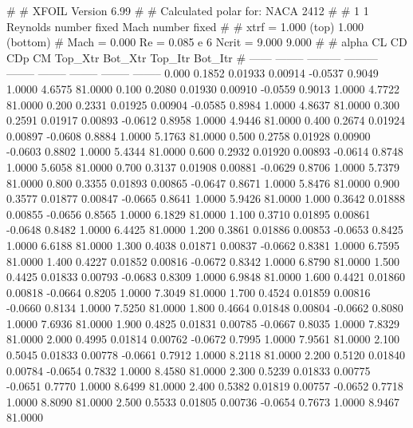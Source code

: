 #  
#       XFOIL         Version 6.99
#  
# Calculated polar for: NACA 2412                                       
#  
# 1 1 Reynolds number fixed          Mach number fixed         
#  
# xtrf =   1.000 (top)        1.000 (bottom)  
# Mach =   0.000     Re =     0.085 e 6     Ncrit =   9.000  9.000
#  
#   alpha    CL        CD       CDp       CM     Top_Xtr  Bot_Xtr  Top_Itr  Bot_Itr
#  ------ -------- --------- --------- -------- -------- -------- -------- --------
   0.000   0.1852   0.01933   0.00914  -0.0537   0.9049   1.0000   4.6575  81.0000
   0.100   0.2080   0.01930   0.00910  -0.0559   0.9013   1.0000   4.7722  81.0000
   0.200   0.2331   0.01925   0.00904  -0.0585   0.8984   1.0000   4.8637  81.0000
   0.300   0.2591   0.01917   0.00893  -0.0612   0.8958   1.0000   4.9446  81.0000
   0.400   0.2674   0.01924   0.00897  -0.0608   0.8884   1.0000   5.1763  81.0000
   0.500   0.2758   0.01928   0.00900  -0.0603   0.8802   1.0000   5.4344  81.0000
   0.600   0.2932   0.01920   0.00893  -0.0614   0.8748   1.0000   5.6058  81.0000
   0.700   0.3137   0.01908   0.00881  -0.0629   0.8706   1.0000   5.7379  81.0000
   0.800   0.3355   0.01893   0.00865  -0.0647   0.8671   1.0000   5.8476  81.0000
   0.900   0.3577   0.01877   0.00847  -0.0665   0.8641   1.0000   5.9426  81.0000
   1.000   0.3642   0.01888   0.00855  -0.0656   0.8565   1.0000   6.1829  81.0000
   1.100   0.3710   0.01895   0.00861  -0.0648   0.8482   1.0000   6.4425  81.0000
   1.200   0.3861   0.01886   0.00853  -0.0653   0.8425   1.0000   6.6188  81.0000
   1.300   0.4038   0.01871   0.00837  -0.0662   0.8381   1.0000   6.7595  81.0000
   1.400   0.4227   0.01852   0.00816  -0.0672   0.8342   1.0000   6.8790  81.0000
   1.500   0.4425   0.01833   0.00793  -0.0683   0.8309   1.0000   6.9848  81.0000
   1.600   0.4421   0.01860   0.00818  -0.0664   0.8205   1.0000   7.3049  81.0000
   1.700   0.4524   0.01859   0.00816  -0.0660   0.8134   1.0000   7.5250  81.0000
   1.800   0.4664   0.01848   0.00804  -0.0662   0.8080   1.0000   7.6936  81.0000
   1.900   0.4825   0.01831   0.00785  -0.0667   0.8035   1.0000   7.8329  81.0000
   2.000   0.4995   0.01814   0.00762  -0.0672   0.7995   1.0000   7.9561  81.0000
   2.100   0.5045   0.01833   0.00778  -0.0661   0.7912   1.0000   8.2118  81.0000
   2.200   0.5120   0.01840   0.00784  -0.0654   0.7832   1.0000   8.4580  81.0000
   2.300   0.5239   0.01833   0.00775  -0.0651   0.7770   1.0000   8.6499  81.0000
   2.400   0.5382   0.01819   0.00757  -0.0652   0.7718   1.0000   8.8090  81.0000
   2.500   0.5533   0.01805   0.00736  -0.0654   0.7673   1.0000   8.9467  81.0000

